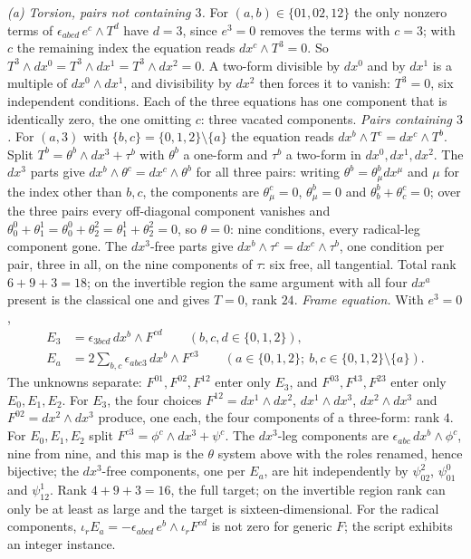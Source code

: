 \emph{(a) Torsion, pairs not containing $3$.} For $(a,b) \in \{01, 02, 12\}$ the only nonzero terms of $\epsilon_{abcd}\,e^c\wedge T^d$ have $d = 3$, since $e^3 = 0$ removes the terms with $c = 3$; with $c$ the remaining index the equation reads $dx^c\wedge T^3 = 0$. So $T^3\wedge dx^0 = T^3\wedge dx^1 = T^3\wedge dx^2 = 0$. A two-form divisible by $dx^0$ and by $dx^1$ is a multiple of $dx^0\wedge dx^1$, and divisibility by $dx^2$ then forces it to vanish: $T^3 = 0$, six independent conditions. Each of the three equations has one component that is identically zero, the one omitting $c$: three vacated components. \emph{Pairs containing $3$.} For $(a, 3)$ with $\{b, c\} = \{0,1,2\}\setminus\{a\}$ the equation reads $dx^b\wedge T^c = dx^c\wedge T^b$. Split $T^b = \theta^b\wedge dx^3 + \tau^b$ with $\theta^b$ a one-form and $\tau^b$ a two-form in $dx^0, dx^1, dx^2$. The $dx^3$ parts give $dx^b\wedge\theta^c = dx^c\wedge\theta^b$ for all three pairs: writing $\theta^b = \theta^b_\mu dx^\mu$ and $\mu$ for the index other than $b, c$, the components are $\theta^c_\mu = 0$, $\theta^b_\mu = 0$ and $\theta^b_b + \theta^c_c = 0$; over the three pairs every off-diagonal component vanishes and $\theta^0_0 + \theta^1_1 = \theta^0_0 + \theta^2_2 = \theta^1_1 + \theta^2_2 = 0$, so $\theta = 0$: nine conditions, every radical-leg component gone. The $dx^3$-free parts give $dx^b\wedge\tau^c = dx^c\wedge\tau^b$, one condition per pair, three in all, on the nine components of $\tau$: six free, all tangential. Total rank $6 + 9 + 3 = 18$; on the invertible region the same argument with all four $dx^a$ present is the classical one and gives $T = 0$, rank $24$. \emph{Frame equation.} With $e^3 = 0$,
\[
\begin{aligned}
E_3 &= \epsilon_{3bcd}\,dx^b\wedge F^{cd} \qquad (b,c,d \in \{0,1,2\}),\\
E_a &= 2\sum_{b,c}\epsilon_{abc3}\,dx^b\wedge F^{c3} \qquad (a \in \{0,1,2\};\ b, c \in \{0,1,2\}\setminus\{a\}).
\end{aligned}
\]
The unknowns separate: $F^{01}, F^{02}, F^{12}$ enter only $E_3$, and $F^{03}, F^{13}, F^{23}$ enter only $E_0, E_1, E_2$. For $E_3$, the four choices $F^{12} = dx^1\wedge dx^2$, $dx^1\wedge dx^3$, $dx^2\wedge dx^3$ and $F^{02} = dx^2\wedge dx^3$ produce, one each, the four components of a three-form: rank $4$. For $E_0, E_1, E_2$ split $F^{c3} = \phi^c\wedge dx^3 + \psi^c$. The $dx^3$-leg components are $\epsilon_{abc}\,dx^b\wedge\phi^c$, nine from nine, and this map is the $\theta$ system above with the roles renamed, hence bijective; the $dx^3$-free components, one per $E_a$, are hit independently by $\psi^2_{02}$, $\psi^0_{01}$ and $\psi^1_{12}$. Rank $4 + 9 + 3 = 16$, the full target; on the invertible region rank can only be at least as large and the target is sixteen-dimensional. For the radical components, $\iota_r E_a = -\epsilon_{abcd}\,e^b\wedge\iota_r F^{cd}$ is not zero for generic $F$; the script exhibits an integer instance.

